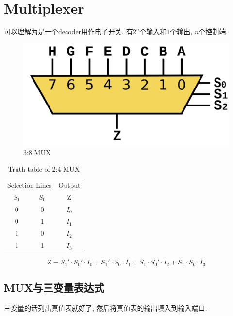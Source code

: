 \documentclass[scheme=chinese,a4paper]{report}
\begin{document}
\section{Multiplexer}
可以理解为是一个decoder用作电子开关. 有$2^n$个输入和$1$个输出, $n$个控制端. 
\begin{figure}[H]
\centering
\includegraphics[width=0.5	\textwidth]{1920px-Multiplexer_8-to-1.svg.png}
\caption{ 3:8 MUX }
\end{figure}
\begin{table}[H]
    \centering
    \caption{Truth table of 2:4 MUX}
      \begin{tabular}{cc|c}
      \multicolumn{2}{c}{Selection Lines} & Output \\
      $S_1$    & $S_0$    & Z \\
      0     & 0     & $I_0$ \\
      0     & 1     & $I_1$ \\
      1     & 0     & $I_2$ \\
      1     & 1     & $I_3$ \\
      \end{tabular}%
  \end{table}%
$$Z=S_1'\cdot S_0'\cdot I_0+S_1'\cdot S_0\cdot I_1+S_1\cdot S_0'\cdot I_2+S_1\cdot S_0\cdot I_3$$
\subsection{MUX与三变量表达式}
三变量的话列出真值表就好了, 然后将真值表的输出填入到输入端口. 
\end{document}
